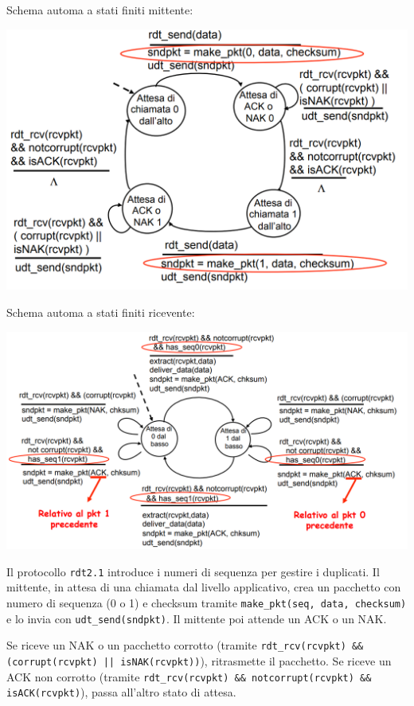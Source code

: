 Schema automa a stati finiti mittente:
\begin{center}
\includegraphics[width=\textwidth]{./img/rdt2.1mit.png}
\end{center}

Schema automa a stati finiti ricevente:
\begin{center}
\includegraphics[width=\textwidth]{./img/rdt2.1ric.png}
\end{center}

Il protocollo \texttt{rdt2.1} introduce i numeri di sequenza per gestire i duplicati. Il mittente, in attesa di una chiamata dal livello applicativo, crea un pacchetto con numero di sequenza (0 o 1) e checksum tramite \texttt{make\_pkt(seq, data, checksum)} e lo invia con \texttt{udt\_send(sndpkt)}. Il mittente poi attende un ACK o un NAK.

Se riceve un NAK o un pacchetto corrotto (tramite \texttt{rdt\_rcv(rcvpkt) \&\& (corrupt(rcvpkt) || isNAK(rcvpkt))}), ritrasmette il pacchetto. Se riceve un ACK non corrotto (tramite \texttt{rdt\_rcv(rcvpkt) \&\& notcorrupt(rcvpkt) \&\& isACK(rcvpkt)}), passa all'altro stato di attesa. 

